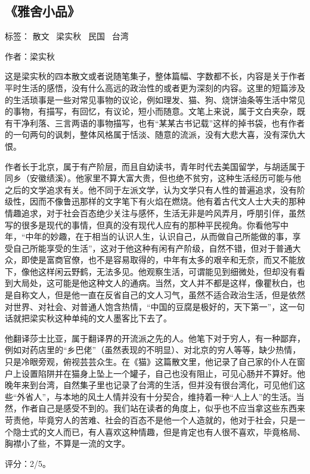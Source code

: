 \subsection{《雅舍小品》}

标签： 散文 \ 梁实秋 \ 民国 \ 台湾

作者：梁实秋

这是梁实秋的四本散文或者说随笔集子，整体篇幅、字数都不长，内容是关于作者平时生活的感悟，没有什么高远的政治性的或者更为深刻的内容。这里的短篇涉及的生活琐事是一些对常见事物的议论，例如理发、猫、狗、烧饼油条等生活中常见的事物，有描写，有回忆，有议论，短小而随意。文笔上来说，属于文白夹杂，既有干净利落、三言两语的事物描写，也有“某某古书记载”这样的掉书袋，也有作者的一句两句的讽刺，整体风格属于恬淡、随意的流派，没有大悲大喜，没有深仇大恨。

作者长于北京，属于有产阶层，而且自幼读书，青年时代去美国留学，与胡适属于同乡（安徽绩溪）。他家里不算大富大贵，但也绝不贫穷，这种生活经历可能与他之后的文学追求有关。他不同于左派文学，认为文学只有人性的普遍追求，没有阶级性，因而不像鲁迅那样的文字笔下有火焰在燃烧。他有着古代文人士大夫的那种情趣追求，对于社会百态绝少关注与感怀，生活无非是吟风弄月，呼朋引伴，虽然写的很多是现代的事情，但真的没有现代人应有的那种平民视角。你看他写中年，“中年的妙趣，在于相当的认识人生，认识自己，从而做自己所能做的事，享受自己所能享受的生活”，这对于他这种有闲有产阶级，自然不错，但对于普通大众，即使是富商官僚，也不是容易取得的，中年有太多的艰辛和无奈，而又不能放下，像他这样闲云野鹤，无法多见。他观察生活，可谓能见到细微处，但却没有看到大局处，这可能是他这种文人的通病。当然，文人并不都是这样，像瞿秋白，也是自称文人，但是他一直在反省自己的文人习气，虽然不适合政治生活，但是依然对世界、对社会、对普通人饱含热情，“中国的豆腐是极好的，天下第一”，这一句话就把梁实秋这种单纯的文人墨客比下去了。

他翻译莎士比亚，属于翻译界的开流派之先的人。他笔下对于穷人，有一种鄙弃，例如对药店里的“乡巴佬”（虽然表现的不明显）、对北京的穷人等等，缺少热情，只是冷眼旁观，俯视芸芸众生。在《猫》这篇散文里，他记录了自己家的仆人在窗户上设置陷阱并在猫身上坠上一个罐子，自己也没有阻止，可见心肠并不算好。他晚年来到台湾，自然集子里也记录了台湾的生活，但并没有很台湾化，可见他们这些“外省人”，与本地的风土人情并没有十分契合，维持着一种“人上人”的生活。当然，作者自己是感受不到的。我们站在读者的角度上，似乎也不应当拿这些东西来苛责他，毕竟穷人的苦难、社会的百态不是他一个人造就的，他对于社会，只是一个隐士式的文人而已，有人喜欢这种情趣，但是肯定也有人很不喜欢，毕竟格局、胸襟小了些，不算是一流的文字。

评分：2/5。